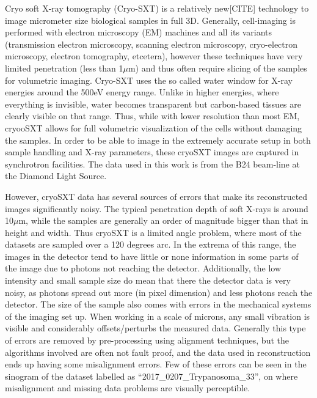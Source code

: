 Cryo soft X-ray tomography (Cryo-SXT) is a relatively new[CITE] technology to image micrometer size biological samples in full 3D. Generally, cell-imaging is performed with electron microscopy (EM) machines and all its variants (transmission electron microscopy, scanning electron microscopy, cryo-electron microscopy, electron tomography, etcetera), however these techniques have very limited penetration (less than 1$\mu$m) and thus often require slicing of the samples for volumetric imaging. Cryo-SXT uses the so called water window for X-ray energies around the 500eV energy range. Unlike in higher energies, where everything is invisible, water becomes transparent but carbon-based tissues are clearly visible on that range. Thus, while with lower resolution than most EM, cryooSXT allows for full volumetric visualization of the cells without damaging the samples. In order to be able to image in the extremely accurate setup in both sample handling and X-ray parameters, these cryoSXT images are captured in synchrotron facilities. The data used in this work is from the B24 beam-line at the Diamond Light Source.

However, cryoSXT data has several sources of errors that make its reconstructed images significantly noisy. The typical penetration depth of soft X-rays is around 10$\mu$m, while the samples are generally an order of magnitude bigger than that in height and width. Thus cryoSXT is a limited angle problem, where most of the datasets are sampled over a 120 degrees arc. In the extrema of this range, the images in the detector tend to have little or none information in some parts of the image due to photons not reaching the detector. Additionally, the low intensity and small sample size do mean that there the detector data is very noisy, as photons spread out more (in pixel dimension) and less photons reach the detector. The size of the sample also comes with errors in the mechanical systems of the imaging set up. When working in a scale of microns, any small vibration is visible and considerably offsets/perturbs the measured data. Generally this type of errors are removed by pre-processing using alignment techniques, but the algorithms involved are often not fault proof, and the data used in reconstruction ends up having some misalignment errors. Few of these errors can be seen in the sinogram of the dataset labelled as ``2017\_0207\_Trypanosoma\_33'', on where misalignment and missing data problems are visually perceptible.